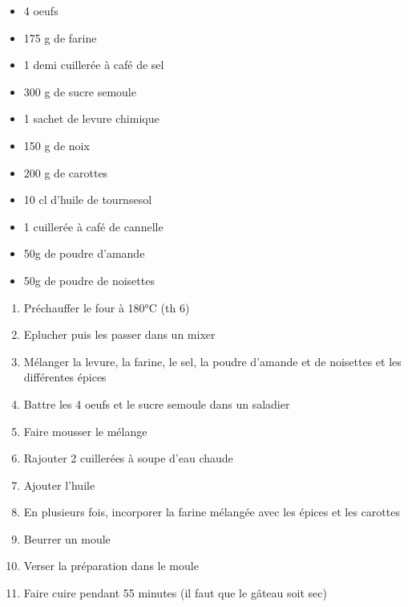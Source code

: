 \bigskip
{}
{}{\begin{itemize}
	\item 4 oeufs
	\item 175 g de farine
	\item 1 demi cuillerée à café de sel
	\item 300 g de sucre semoule
	\item 1 sachet de levure chimique
	\item 150 g de noix
	\item 200 g de carottes
	\item 10 cl d'huile de tournsesol
	\item 1 cuillerée à café de cannelle
	\item 50g de poudre d'amande
	\item 50g de poudre de noisettes
\end{itemize}}
{\phantom{.}

\medskip
\begin{enumerate}
	\item Préchauffer le four à 180°C (th 6)
	\item Eplucher puis les passer dans un mixer
	\item Mélanger la levure, la farine, le sel, la poudre d'amande et de noisettes et les différentes épices
	\item Battre les 4 oeufs et le sucre semoule dans un saladier
	\item Faire mousser le mélange
	\item Rajouter 2 cuillerées à soupe d'eau chaude
	\item Ajouter l'huile
	\item En plusieurs fois, incorporer la farine mélangée avec les épices et les carottes
	\item Beurrer un moule
	\item Verser la préparation dans le moule
	\item Faire cuire pendant 55 minutes (il faut que le gâteau soit sec)
\end{enumerate}

\medskip
\phantom{.}}

